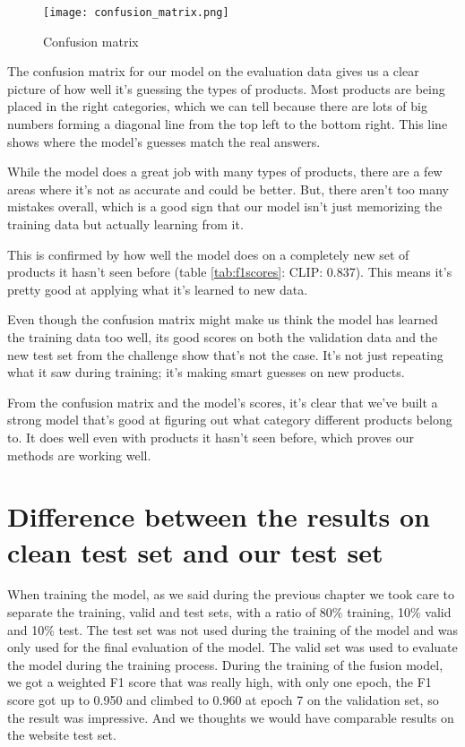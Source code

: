 \begin{figure}[H]
	\centering
	\texttt{[image: confusion\_matrix.png]}
	\caption{Confusion matrix}
	\label{fig:confusionmatrix}
\end{figure}

The confusion matrix for our model on the evaluation data gives us a clear picture of how well it's guessing the types of products. Most products are being placed in the right categories, which we can tell because there are lots of big numbers forming a diagonal line from the top left to the bottom right. This line shows where the model's guesses match the real answers.

While the model does a great job with many types of products, there are a few areas where it's not as accurate and could be better. But, there aren't too many mistakes overall, which is a good sign that our model isn't just memorizing the training data but actually learning from it.

This is confirmed by how well the model does on a completely new set of products it hasn't seen before (table \ref*{tab:f1scores}: CLIP: 0.837). This means it's pretty good at applying what it's learned to new data.

Even though the confusion matrix might make us think the model has learned the training data too well, its good scores on both the validation data and the new test set from the challenge show that's not the case. It's not just repeating what it saw during training; it's making smart guesses on new products.

From the confusion matrix and the model's scores, it's clear that we've built a strong model that's good at figuring out what category different products belong to. It does well even with products it hasn't seen before, which proves our methods are working well.


\section{Difference between the results on clean test set and our test set}
When training the model, as we said during the previous chapter we took care
to separate the training, valid and test sets, with a ratio of 80\% training, 10\%
valid and 10\% test. The test set was not used during the training of the model
and was only used for the final evaluation of the model. The valid set was used
to evaluate the model during the training process. During the training of the
fusion model, we got a weighted F1 score that was really high, with only one
epoch, the F1 score got up to 0.950 and climbed to 0.960 at epoch 7 on the
validation set, so the result was impressive. And we thoughts we would have
comparable results on the website test set.

